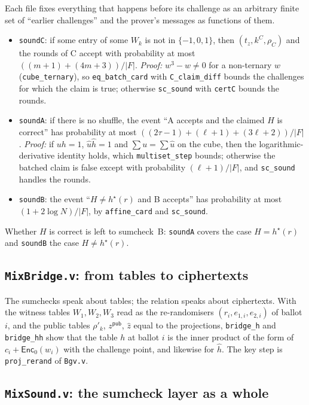\documentclass[11pt,a4paper]{article}
\newcommand{\EncZ}{\mathsf{Enc}_0}
\newcommand{\msk}[1]{#1^{\star}}
\newcommand{\uh}{\hat{u}}
\newcommand{\hh}{\hat{h}}
\newcommand{\zh}{\hat{z}}
\theoremstyle{definition}
\theoremstyle{plain}
\begin{document}
Each file fixes everything that happens before its challenge as an arbitrary finite set of
``earlier challenges'' and the prover's messages as functions of them.
\begin{itemize}[leftmargin=1.3em]
\item \texttt{soundC}: if some entry of some $W_k$ is not in $\{-1,0,1\}$, then
  $(t_z,k^C,\rho_C)$ and the rounds of C accept with probability at most $((m+1)+(4m+3))/|F|$.
  \emph{Proof:} $w^3-w\ne0$ for a non-ternary $w$ (\texttt{cube\_ternary}), so \texttt{eq\_batch\_card}
  with \texttt{C\_claim\_diff} bounds the challenges for which the claim is true; otherwise
  \texttt{sc\_sound} with \texttt{certC} bounds the rounds.
\item \texttt{soundA}: if there is no shuffle, the event ``A accepts and the claimed $H$ is correct''
  has probability at most $((2\tau-1)+(\ell+1)+(3\ell+2))/|F|$. \emph{Proof:} if $uh=1$, $\uh\hh=1$
  and $\sum u=\sum\uh$ on the cube, then the logarithmic-derivative identity holds, which
  \texttt{multiset\_step} bounds; otherwise the batched claim is false except with probability
  $(\ell+1)/|F|$, and \texttt{sc\_sound} handles the rounds.
\item \texttt{soundB}: the event ``$H\ne\msk h(r)$ and B accepts'' has probability at most
  $(1+2\log N)/|F|$, by \texttt{affine\_card} and \texttt{sc\_sound}.
\end{itemize}
Whether $H$ is correct is left to sumcheck~B: \texttt{soundA} covers the case $H=\msk h(r)$ and
\texttt{soundB} the case $H\ne\msk h(r)$.

\subsection{\texttt{MixBridge.v}: from tables to ciphertexts}

The sumchecks speak about tables; the relation speaks about ciphertexts. With the witness tables
$W_1,W_2,W_3$ read as the re-randomisers $(r_i,e_{1,i},e_{2,i})$ of ballot $i$, and the public tables
$\rho'_k$, $z^{\mathsf{pub}}$, $\zh$ equal to the projections, \texttt{bridge\_h} and
\texttt{bridge\_hh} show that the table $h$ at ballot $i$ is the inner product of the form of
$c_i+\EncZ(w_i)$ with the challenge point, and likewise for $\hh$. The key step is
\texttt{proj\_rerand} of \texttt{Bgv.v}.

\subsection{\texttt{MixSound.v}: the sumcheck layer as a whole}
\end{document}
